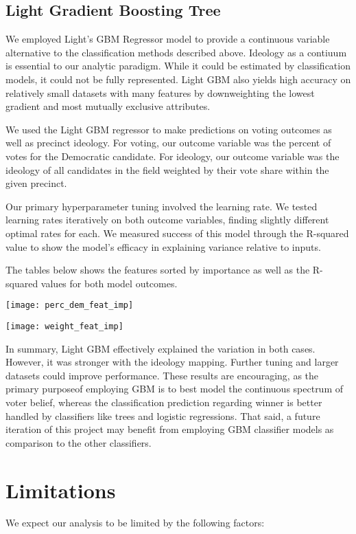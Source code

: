 \documentclass{article}
\begin{document}
\begin{itemize}
\subsection{Light Gradient Boosting Tree}

We employed Light's GBM Regressor model to provide a continuous variable alternative
to the classification methods described above. Ideology as a contiuum 
is essential to our analytic paradigm. While it could be estimated by classification
models, it could not be fully represented. Light GBM also yields high accuracy
on relatively small datasets with many features by downweighting the lowest gradient
and most mutually exclusive attributes.

We used the Light GBM regressor to make predictions on voting outcomes as well as
precinct ideology. For voting, our outcome variable was the percent of votes for the
Democratic candidate. For ideology, our outcome variable was the ideology of all
candidates in the field weighted by their vote share within the given precinct.

Our primary hyperparameter tuning involved the learning rate. We tested learning rates
iteratively on both outcome variables, finding slightly different optimal rates for each.
We measured success of this model through the R-squared value to show the model's
efficacy in explaining variance relative to inputs.

The tables below shows the features sorted by importance as well as the R-squared values
for both model outcomes.

\texttt{[image: perc\_dem\_feat\_imp]}

\texttt{[image: weight\_feat\_imp]}

In summary, Light GBM effectively explained the variation in both cases. However, it was
stronger with the ideology mapping. Further tuning and larger datasets could improve performance. 
These results are encouraging, as the primary purposeof employing GBM is to best model the
continuous spectrum of voter belief, whereas the classification prediction regarding winner
is better handled by classifiers like trees and logistic regressions. That said, a future
iteration of this project may benefit from employing GBM classifier models as comparison to
the other classifiers.

\section{Limitations}

We expect our analysis to be limited by the following factors:


\end{itemize}
\end{document}
